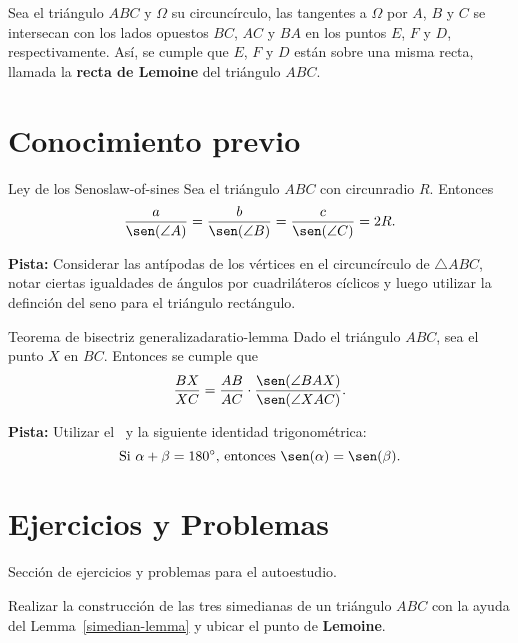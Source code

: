 \begin{section-definition.tcb}
    Sea el triángulo $ABC$ y $\Omega$ su circuncírculo, las tangentes a $\Omega$ por $A$, $B$ y $C$ se intersecan con los lados opuestos $BC$, $AC$ y $BA$ en los puntos $E$, $F$ y $D$, respectivamente.
    Así, se cumple que $E$, $F$ y $D$ están sobre una misma recta, llamada la \textbf{recta de Lemoine} del triángulo $ABC$.
\end{section-definition.tcb}
\vspace{-2mm}




\section{Conocimiento previo}


\begin{section-theorem.tcb}{Ley de los Senos}{law-of-sines}
    Sea el triángulo $ABC$ con circunradio $R$.
    Entonces
    \[
        \frac{a}{\sen(\angle A)} = \frac{b}{\sen(\angle B)} = \frac{c}{\sen(\angle C)} = 2R.
    \]
\end{section-theorem.tcb}

\textbf{Pista:} Considerar las antípodas de los vértices en el circuncírculo de $\triangle ABC$, notar ciertas igualdades de ángulos por cuadriláteros cíclicos y luego utilizar la definción del seno para el triángulo rectángulo.


\begin{section-theorem.tcb}{Teorema de bisectriz generalizada}{ratio-lemma}
    Dado el triángulo $ABC$, sea el punto $X$ en $BC$.
    Entonces se cumple que
    \[
        \frac{BX}{XC} = \frac{AB}{AC} \cdot \frac{\sen(\angle BAX)}{\sen(\angle XAC)}.
    \]
\end{section-theorem.tcb}

\textbf{Pista:} Utilizar el~ y la siguiente identidad trigonométrica:
\[
    \text{Si}\ \alpha + \beta = 180^\circ\text{,}\ \text{entonces}\ \sen(\alpha) = \sen(\beta).
\]




\section{Ejercicios y Problemas}

Sección de ejercicios y problemas para el autoestudio.

\begin{section-exercise}
    Realizar la construcción de las tres simedianas de un triángulo $ABC$ con la ayuda del Lemma~\ref{simedian-lemma} y ubicar el punto de \textbf{Lemoine}.
\end{section-exercise}


